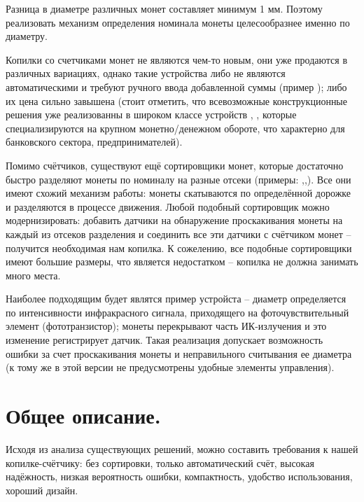 Разница в диаметре различных монет составляет минимум 1 мм. Поэтому реализовать механизм определения номинала монеты целесообразнее именно по диаметру.
\par\medskip

Копилки со счетчиками монет не являются чем-то новым, они уже продаются в различных вариациях, однако такие устройства либо не являются автоматическими и требуют ручного ввода добавленной суммы (пример \cite{Ozon_manual_work}); либо их цена сильно завышена \cite{Ali_auto_work} (стоит отметить, что всевозможные конструкционные решения уже реализованны в широком классе устройств \cite{Cassida}, \cite{Sort_Cassida}, которые специализируются на крупном монетно/денежном обороте, что характерно для банковского сектора, предпринимателей).
\par\medskip

Помимо счётчиков, существуют ещё сортировщики монет, которые достаточно быстро разделяют монеты по номиналу на разные отсеки (примеры: \cite{Sort_Cassida},\cite{Sort_hill},\cite{Sort_default}). Все они имеют схожий механизм работы: монеты скатываются по определённой дорожке и разделяются в процессе движения. Любой подобный сортировщик можно модернизировать: добавить датчики на обнаружение проскакивания монеты на каждый из отсеков разделения и соединить все эти датчики с счётчиком монет -- получится необходимая нам копилка. К сожелению, все подобные сортировщики имеют большие размеры, что является недостатком -- копилка не должна занимать много места.
\par\medskip

Наиболее подходящим будет являтся пример устройста \cite{Gyver} -- диаметр определяется по интенсивности инфракрасного сигнала, приходящего на фоточувствительный элемент (фототранзистор); монеты перекрывают часть ИК-излучения и это изменение регистрирует датчик. Такая реализация допускает возможность ошибки за счет проскакивания монеты и неправильного считывания ее диаметра (к тому же в этой версии не предусмотрены удобные элементы управления).
\par\medskip

\section {Общее описание.}

Исходя из анализа существующих решений, можно составить требования к нашей копилке-счётчику: без сортировки, только автоматический счёт, высокая надёжность, низкая вероятность ошибки, компактность, удобство использования, хороший дизайн.
\par\medskip

